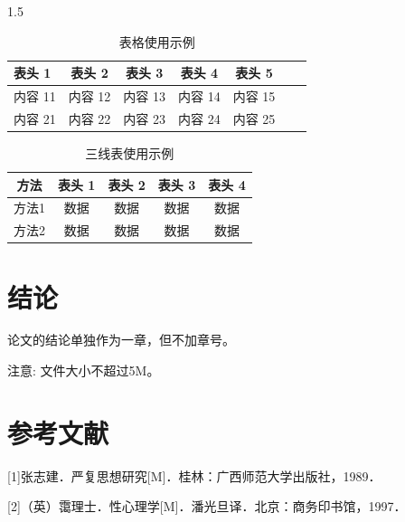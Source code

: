 \documentclass[zihao=-4]{ctexart}
\begin{document}
\begin{spacing}{1.5}

\begin{table}[t]
\centering
\caption{表格使用示例}
\begin{tabular}{|l||c|c|c|c|c|c|}
\hline
{\textbf{表头 1}}     &  表头 2 	    & 表头 3 	  & 表头 4     & 表头 5 		\\ \hline\hline
内容 11 		          & 内容 12				& 内容 13		& 内容 14 	 & 内容 15		\\ \hline
内容 21	              & 内容 22				& 内容 23		& 内容 24	   & 内容 25		\\ \hline


\end{tabular}
\end{table}


\begin{table}[H]
\caption{三线表使用示例}
\centering
\begin{tabular}{ccccc}
\hline  
\textbf{方法} & \textbf{表头 1} & \textbf{表头 2} & \textbf{表头 3} & \textbf{表头 4} \\ 
\hline  
方法1 & 数据  & 数据  & 数据  & 数据\\
方法2 & 数据  & 数据  & 数据  & 数据\\
\hline
\end{tabular} 
\end{table} 

\section*{结论}%
论文的结论单独作为一章，但不加章号。

注意: 文件大小不超过5M。

\end{spacing}

\newpage

\section*{参考文献} %
[1]张志建．严复思想研究[M]．桂林：广西师范大学出版社，1989． 

[2]（英）霭理士．性心理学[M]．潘光旦译．北京：商务印书馆，1997．
\end{document}
